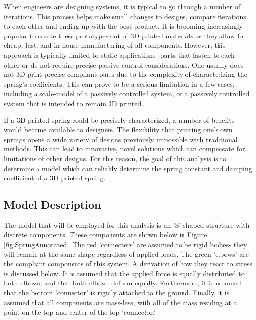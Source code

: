 \documentclass[conference]{article}
\begin{document}

When engineers are designing systems, it is typical to go through a number of iterations. This process helps make small changes to designs, compare iterations to each other and ending up with the best product. It is becoming increasingly popular to create these prototypes out of 3D printed materials as they allow for cheap, fast, and in-house manufacturing of all components. However, this approach is typically limited to static applications- parts that fasten to each other or do not require precise passive control considerations. One usually does not 3D print precise compliant parts due to the complexity of characterizing the spring's coefficients.  This can prove to be a serious limitation in a few cases, including a scale-model of a passively controlled system, or a passively controlled system that is intended to remain 3D printed. 

If a 3D printed spring could be precisely characterized, a number of benefits would become available to designers. The flexibility that printing one's own springs opens a wide variety of designs previously impossible with traditional methods. This can lead to innovative, novel solutions which can compensate for limitations of other designs. For this reason, the goal of this analysis is to determine a model which can reliably determine the spring constant and damping coefficient of a 3D printed spring.


\subsection{Model Description}

The model that will be employed for this analysis is an 'S'-shaped structure with discrete components. These components are shown below in Figure \ref{fig:SpringAnnotated}. The red 'connecters' are assumed to be rigid bodies- they will remain at the same shape regardless of applied loads. The green 'elbows' are the compliant components of this system. A derivation of how they react to stress is discussed below. It is assumed that the applied force is equally distributed to both elbows, and that both elbows deform equally. Furthermore, it is assumed that the bottom 'connector' is rigidly attached to the ground. Finally, it is assumed that all components are mass-less, with all of the mass residing at a point on the top and center of the top 'connector.'
\end{document}
